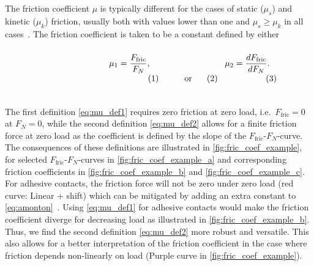 The friction coefficient $\mu$ is typically different for the cases of static
($\mu_s$) and kinetic ($\mu_k$) friction, usually both with values lower than
one and $\mu_s \ge \mu_k$ in all cases~\cite[p. 6]{gnecco_meyer_2015}. The friction coefficient is taken to be a constant defined by either
\cite{gao_frictional_2004} \\
\vspace{0.1cm}
\begin{subequations}
\noindent\begin{minipage}{.2\linewidth}
  \hfill
\end{minipage}
\begin{minipage}[b]{0.2\linewidth}
  \begin{align}
    \mu_1 = \frac{F_{\text{fric}}}{F_N},
    \label{eq:mu_def1}
  \end{align}
\end{minipage}
\begin{minipage}[b]{0.2\linewidth}
  \begin{align*}
    \text{or}
  \end{align*}
\end{minipage}
\begin{minipage}[b]{0.2\linewidth}
  \begin{align}
    \mu_2 = \frac{dF_{\text{fric}}}{dF_N}.
    \label{eq:mu_def2}
  \end{align}
\end{minipage}
\begin{minipage}{.2\linewidth}
\end{minipage}
\label{eq:mu_def}
\end{subequations}
\vspace{0.1cm}
\\
\noindent The first definition \cref{eq:mu_def1} requires zero friction at zero
load, i.e.\ $F_{\text{fric}} = 0$ at $F_N = 0$, while the second definition
\cref{eq:mu_def2} allows for a finite friction force at zero load as the
coefficient is defined by the slope of the $F_{\text{fric}}$-$F_N$-curve. The
consequences of these definitions are illustrated in
\cref{fig:fric_coef_example}, for selected $F_{\text{fric}}$-$F_N$-curves in
\cref{fig:fric_coef_example_a} and corresponding friction coefficients in
\cref{fig:fric_coef_example_b} and \cref{fig:fric_coef_example_c}. For adhesive
contacts, the friction force will not be zero under zero load (red curve: Linear
+ shift) which can be mitigated by adding an extra constant to
\cref{eq:amonton}~\cite{gao_frictional_2004}. Using \cref{eq:mu_def1} for
adhesive contacts would make the friction coefficient diverge for decreasing
load as illustrated in \cref{fig:fric_coef_example_b}. Thus, we find the second
definition \cref{eq:mu_def2} more robust and versatile. This also allows for a better interpretation of the friction coefficient in the case where
friction depends non-linearly on load (Purple curve in
\cref{fig:fric_coef_example}). 


